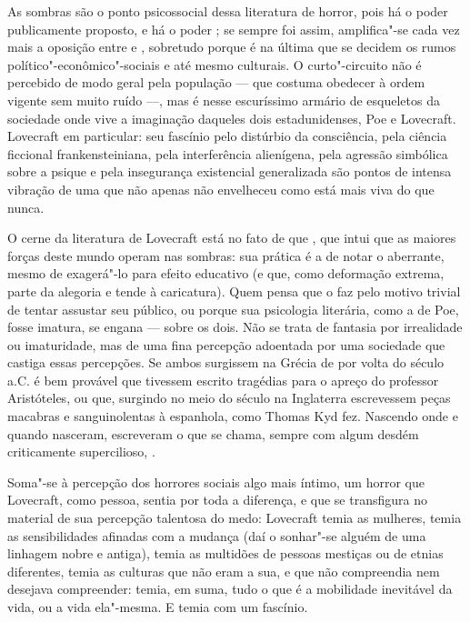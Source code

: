 \begin{multicols}{2}
As sombras são o ponto psicossocial dessa literatura de horror, pois há o poder publicamente proposto, e há o
poder {}; se sempre foi assim, amplifica"-se cada vez mais a oposição entre
{} e {}, sobretudo porque é
na última que se decidem os rumos político"-econômico"-sociais e até mesmo
culturais. O curto"-circuito não é percebido de modo geral pela população
--- que costuma obedecer à ordem vigente sem muito ruído ---, mas é
nesse escuríssimo armário de esqueletos da sociedade onde vive a
imaginação daqueles dois estadunidenses, Poe e Lovecraft. Lovecraft em
particular: seu fascínio pelo distúrbio da consciência, pela ciência
ficcional frankensteiniana, pela interferência alienígena, pela agressão
simbólica sobre a psique e pela insegurança existencial generalizada são
pontos de intensa vibração de uma {} que não apenas não
envelheceu como está mais viva do que nunca.

O cerne da literatura de Lovecraft está no fato de que {},
que intui que as maiores forças deste mundo operam nas sombras: sua prática é a de
notar o aberrante, mesmo de exagerá"-lo para efeito educativo (e que,
como deformação extrema, parte da alegoria e tende à caricatura). Quem
pensa que o faz pelo motivo trivial de tentar assustar seu público, ou
porque sua psicologia literária, como a de Poe, fosse imatura, se engana
--- sobre os dois. Não se trata de fantasia por irrealidade ou
imaturidade, mas de uma fina percepção adoentada por uma sociedade que
castiga essas percepções. Se ambos surgissem na Grécia de por volta do
século  a.C. é bem provável que tivessem escrito tragédias para o
apreço do professor Aristóteles, ou que, surgindo no meio do século 
na Inglaterra escrevessem peças macabras e sanguinolentas à espanhola,
como Thomas Kyd fez. Nascendo onde e quando nasceram, escreveram o que
se chama, sempre com algum desdém criticamente supercilioso,
{}.

Soma"-se à percepção dos horrores sociais algo mais íntimo, um horror que Lovecraft, como pessoa, sentia por toda a diferença, e que se
transfigura no material de sua percepção talentosa do medo: Lovecraft
temia as mulheres, temia as sensibilidades afinadas com a mudança (daí o
sonhar"-se alguém de uma linhagem nobre e antiga), temia as multidões de
pessoas mestiças ou de etnias diferentes, temia as culturas que não eram
a sua, e que não compreendia nem desejava compreender: temia, em suma,
tudo o que é a mobilidade inevitável da vida, ou a vida ela"-mesma. E
temia com um fascínio.


\end{multicols}
